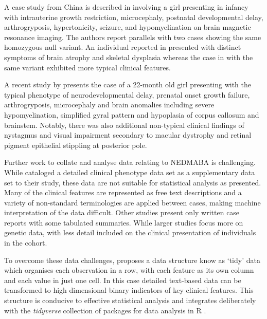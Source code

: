 \documentclass[
  authoryear,
  preprint,
  3p]{elsarticle}
\begin{document}
A case study from China is described in \citet{ji2022case} involving a
girl presenting in infancy with intrauterine growth restriction,
microcephaly, postnatal developmental delay, arthrogryposis,
hypertonicity, seizure, and hypomyelination on brain magnetic resonance
imaging. The authors report parallels with two cases showing the same
homozygous null variant. An individual reported in
\citet{monies2019lessons} presented with distinct symptoms of brain
atrophy and skeletal dysplasia whereas the case in
\citet{magini2019loss} with the same variant exhibited more typical
clinical features.

A recent study by \citet{bijarnia2022growth} presents the case of a
22-month old girl presenting with the typical phenotype of
neurodevelopmental delay, prenatal onset growth failure, arthrogryposis,
microcephaly and brain anomalies including severe hypomyelination,
simplified gyral pattern and hypoplasia of corpus callosum and
brainstem. Notably, there was also additional non-typical clinical
findings of nystagmus and visual impairment secondary to macular
dystrophy and retinal pigment epithelial stippling at posterior pole.

Further work to collate and analyse data relating to NEDMABA is
challenging. While \citet{magini2019loss} cataloged a detailed clinical
phenotype data set as a supplementary data set to their study, these
data are not suitable for statistical analysis as presented. Many of the
clinical features are represented as free text descriptions and a
variety of non-standard terminologies are applied between cases, making
machine interpretation of the data difficult. Other studies
\citep{ji2022case, bijarnia2022growth} present only written case reports
with some tabulated summaries. While larger studies
\citep{ravenscroft2021neurogenetic, monies2019lessons} focus more on
genetic data, with less detail included on the clinical presentation of
individuals in the cohort.

To overcome these data challenges, \citet{JSSv059i10} proposes a data
structure know as `tidy' data which organises each observation in a row,
with each feature as its own column and each value in just one cell. In
this case detailed text-based data can be transformed to high
dimensional binary indicators of key clinical features. This structure
is conducive to effective statistical analysis and integrates
deliberately with the \emph{tidyverse} \citep{tidyverse} collection of
packages for data analysis in R \citep{rbase}.
\end{document}
